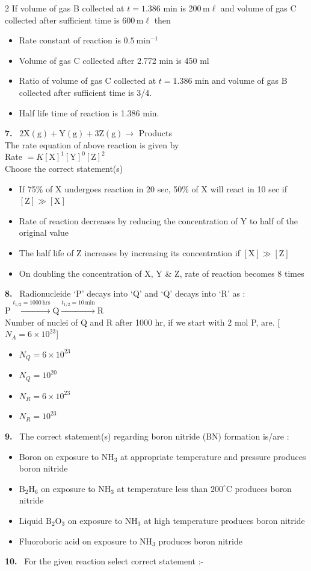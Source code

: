 \documentclass[10pt]{extarticle}
\newcommand{\qn}[1]{\par\smallskip\noindent\textbf{#1.}~}
\newenvironment{qoptions}{\begin{itemize}[leftmargin=1.8em,itemsep=1pt,topsep=2pt,label={}]}{\end{itemize}}
\newcommand{\opt}[2]{\item[(#1)] #2}
\begin{document}
\begin{multicols}{2}
If volume of gas B collected at $t=1.386$ min is 200\,m$\ell$ and volume of gas C collected after sufficient time is 600\,m$\ell$ then
\begin{qoptions}
\opt{A}{Rate constant of reaction is $0.5\ \mathrm{min^{-1}}$}
\opt{B}{Volume of gas C collected after 2.772 min is 450 ml}
\opt{C}{Ratio of volume of gas C collected at $t=1.386$ min and volume of gas B collected after sufficient time is 3/4.}
\opt{D}{Half life time of reaction is 1.386 min.}
\end{qoptions}
\qn{7} $2\mathrm{X(g)}+\mathrm{Y(g)}+3\mathrm{Z(g)}\to$ Products\\
The rate equation of above reaction is given by\\
Rate $=K[\mathrm X]^1[\mathrm Y]^0[\mathrm Z]^2$\\
Choose the correct statement(s)
\begin{qoptions}
\opt{A}{If 75\% of X undergoes reaction in 20 sec, 50\% of X will react in 10 sec if $[\mathrm Z]\gg[\mathrm X]$}
\opt{B}{Rate of reaction decreases by reducing the concentration of Y to half of the original value}
\opt{C}{The half life of Z increases by increasing its concentration if $[\mathrm X]\gg[\mathrm Z]$}
\opt{D}{On doubling the concentration of X, Y \& Z, rate of reaction becomes 8 times}
\end{qoptions}
\qn{8} Radionucleide `P' decays into `Q' and `Q' decays into `R' as :\\
$\mathrm{P}\xrightarrow{t_{1/2}=1000\,\mathrm{hrs}}\mathrm{Q}\xrightarrow{t_{1/2}=10\,\mathrm{min}}\mathrm{R}$\\
Number of nuclei of Q and R after 1000 hr, if we start with 2 mol P, are. [$N_A=6\times10^{23}$]
\begin{qoptions}
\opt{A}{$N_Q=6\times10^{23}$}
\opt{B}{$N_Q=10^{20}$}
\opt{C}{$N_R=6\times10^{23}$}
\opt{D}{$N_R=10^{23}$}
\end{qoptions}
\qn{9} The correct statement(s) regarding boron nitride (BN) formation is/are :
\begin{qoptions}
\opt{A}{Boron on exposure to $\mathrm{NH_3}$ at appropriate temperature and pressure produces boron nitride}
\opt{B}{$\mathrm{B_2H_6}$ on exposure to $\mathrm{NH_3}$ at temperature less than $200^\circ$C produces boron nitride}
\opt{C}{Liquid $\mathrm{B_2O_3}$ on exposure to $\mathrm{NH_3}$ at high temperature produces boron nitride}
\opt{D}{Fluoroboric acid on exposure to $\mathrm{NH_3}$ produces boron nitride}
\end{qoptions}
\qn{10} For the given reaction select correct statement :-\\

\end{multicols}
\end{document}
